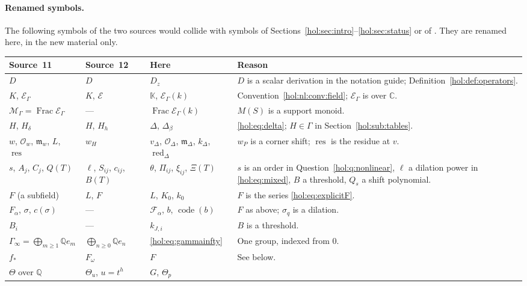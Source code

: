 \documentclass[11pt]{article}
\numberwithin{equation}{section}
\theoremstyle{definition}
\theoremstyle{remark}
\newcommand{\C}{\mathbb C}
\newcommand{\Q}{\mathbb Q}
\newcommand{\E}{\mathcal E_\Gamma}
\newcommand{\res}{\operatorname{res}}
\newcommand{\KK}{\mathbb K}
\newcommand{\EK}{\mathcal E_\Gamma(k)}
\newcommand{\FE}{\operatorname{Frac}\EK}
\newcommand{\red}{\operatorname{red}}
\newcommand{\code}{\operatorname{code}}
\begin{document}
\paragraph{Renamed symbols.}
The following symbols of the two sources would collide with symbols of
Sections~\ref{hol:sec:intro}--\ref{hol:sec:status} or of
. They are renamed here, in the new material only.
\begin{center}
\small
\begin{tabularx}{\textwidth}{@{}>{\raggedright\arraybackslash}p{}
>{\raggedright\arraybackslash}p{}
>{\raggedright\arraybackslash}p{}X@{}}
\toprule
Source~11 & Source~12 & Here & Reason\\
\midrule
$D$ & $D$ & $D_z$ & $D$ is a scalar derivation in the notation guide;
Definition~\ref{hol:def:operators}.\\
$K$, $\mathcal E_\Gamma$ & $K$, $\mathcal E$ & $\KK$, $\EK$ &
Convention~\ref{hol:nl:conv:field}; $\E$ is over $\C$.\\
$\mathcal M_\Gamma=\operatorname{Frac}\mathcal E_\Gamma$ & --- & $\FE$ &
$M(S)$ is a support monoid.\\
$H$, $H_\delta$ & $H$, $H_h$ & $\Delta$, $\Delta_\beta$ &
\eqref{hol:eq:delta}; $H\in\Gamma$ in Section~\ref{hol:sub:tables}.\\
$w$, $\mathcal O_w$, $\mathfrak m_w$, $L$, $\res$ & $w_H$ & $v_\Delta$,
$\mathcal O_\Delta$, $\mathfrak m_\Delta$, $k_\Delta$, $\red_\Delta$ &
$w_P$ is a corner shift; $\res$ is the residue at $v$.\\
$s$, $A_j$, $C_j$, $Q(T)$ & $\ell$, $S_{ij}$, $c_{ij}$, $B(T)$ & $\theta$,
$\Pi_{ij}$, $\xi_{ij}$, $\Xi(T)$ & $s$ is an order in
Question~\ref{hol:q:nonlinear}, $\ell$ a dilation power in
\eqref{hol:eq:mixed}, $B$ a threshold, $Q_s$ a shift polynomial.\\
$F$ (a subfield) & $L$, $F$ & $L$, $K_0$, $k_0$ & $F$ is the series
\eqref{hol:eq:explicitF}.\\
$F_\alpha$, $\sigma$, $c(\sigma)$ & --- & $\mathcal F_\alpha$, $b$,
$\code(b)$ & $F$ as above; $\sigma_q$ is a dilation.\\
$B_i$ & --- & $k_{J,i}$ & $B$ is a threshold.\\
$\Gamma_\infty=\bigoplus_{m\ge1}\Q e_m$ & $\bigoplus_{n\ge0}\Q e_n$ &
\eqref{hol:eq:gammainfty} & One group, indexed from $0$.\\
$f_*$ & $F_\omega$ & $F$ & See below.\\
$\Theta$ over $\Q$ & $\Theta_u$, $u=t^h$ & $G$, $\Theta_p$ &

\end{tabularx}
\end{center}
\end{document}
